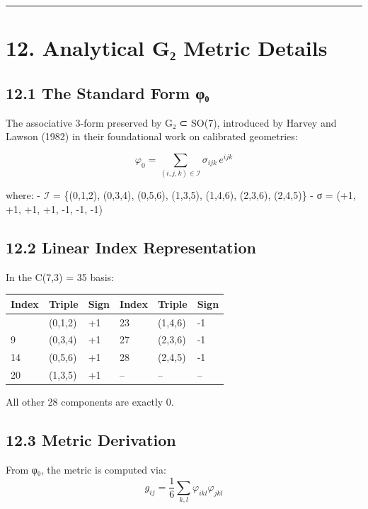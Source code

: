 \documentclass[11pt,a4paper]{article}
\begin{document}
\begin{center}\rule{\linewidth}{0.5pt}\end{center}

\section{12. Analytical G₂ Metric Details}\label{analytical-gux2082-metric-details}

\subsection{12.1 The Standard Form φ₀}\label{the-standard-form-ux3c6ux2080}

The associative 3-form preserved by G₂ ⊂ SO(7), introduced by Harvey and Lawson (1982) in their foundational work on calibrated geometries:

\[\varphi_0 = \sum_{(i,j,k) \in \mathcal{I}} \sigma_{ijk} \, e^{ijk}\]

where: - \ensuremath{\mathcal{I}} = \{(0,1,2), (0,3,4), (0,5,6), (1,3,5), (1,4,6), (2,3,6), (2,4,5)\} - σ = (+1, +1, +1, +1, -1, -1, -1)

\subsection{12.2 Linear Index Representation}\label{linear-index-representation}

In the C(7,3) = 35 basis:

\begin{longtable}[]{@{}llllll@{}}
\toprule\noalign{}
Index & Triple & Sign & Index & Triple & Sign \\
\midrule\noalign{}
\endhead
\bottomrule\noalign{}
\endlastfoot
0 & (0,1,2) & +1 & 23 & (1,4,6) & -1 \\
9 & (0,3,4) & +1 & 27 & (2,3,6) & -1 \\
14 & (0,5,6) & +1 & 28 & (2,4,5) & -1 \\
20 & (1,3,5) & +1 & -- & -- & -- \\
\end{longtable}

All other 28 components are exactly 0.

\subsection{12.3 Metric Derivation}\label{metric-derivation}

From φ₀, the metric is computed via: \[g_{ij} = \frac{1}{6} \sum_{k,l} \varphi_{ikl} \varphi_{jkl}\]
\end{document}
